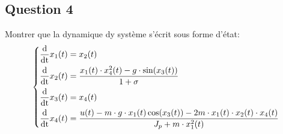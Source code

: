 \documentclass[class=article, crop=false]{standalone}
\begin{document}
\subsection{Question 4}
\begin{exercise}
    Montrer que la dynamique dy système s'écrit sous forme d'état:
    \begin{equation}
        \begin{dcases}
            \frac{\text{d}}{\text{dt}} x_1(t) = x_2(t)\\
            \frac{\text{d}}{\text{dt}} x_2(t) = \frac{x_1(t) \cdot x^2_4(t) - g \cdot \sin(x_3(t))}{1 + \sigma}\\
            \frac{\text{d}}{\text{dt}} x_3(t) = x_4(t)\\
            \frac{\text{d}}{\text{dt}} x_4(t) = \frac{u(t) - m \cdot g \cdot x_1(t) \cos(x_3(t)) - 2 m \cdot x_1(t) \cdot x_2(t) \cdot x_4(t)}{J_p + m \cdot x^2_1(t)}\\
        \end{dcases}
    \end{equation}
\end{exercise}
\end{document}
